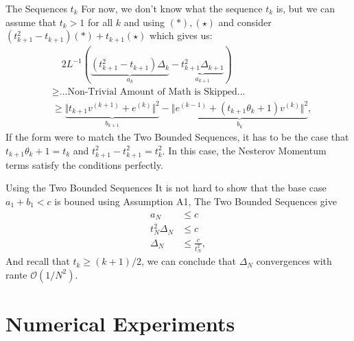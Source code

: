 \documentclass[11pt]{beamer}
\begin{document}
        \begin{frame}{The Sequences $t_k$}
            For now, we don't know what the sequence $t_k$ is, but we can assume that $t_k > 1$ for all $k$ and using $(*), (\star)$ and consider $(t_{k + 1}^2- t_{k + 1})(*) + t_{k + 1}(\star)$ which gives us: 
            {\scriptsize
                \begin{align*}
                    & \quad 2L^{-1}(
                        \underbrace{(t_{k + 1}^2 - t_{k + 1})
                        \Delta_k}_{a_k}
                        - 
                        \underbrace{t_{k + 1}^2\Delta_{k + 1}}_{a_{k + 1}}
                    )
                    \\
                    & \ge \text{...Non-Trivial Amount of Math is Skipped...}
                    \\
                    & \ge  
                    \underbrace{\Vert t_{k + 1}v^{(k + 1)} + e^{(k)}\Vert^2}_{b_{k + 1}}
                    - 
                    \underbrace{\Vert e^{(k - 1)} + (t_{k + 1}\theta_k + 1) v^{(k)} \Vert^2}_{b_k},
                    \tag{$\star \star$}
                \end{align*}
                }
                If the form were to match the Two Bounded Sequences, it has to be the case that $t_{k + 1}\theta_k + 1 = t_{k}$ and $t^2_{k + 1} - t_{k + 1}^2 = t_k^2$. In this case, the Nesterov Momentum terms satisfy the conditions perfectly. 
        \end{frame}
        \begin{frame}{Using the Two Bounded Sequences}
            It is not hard to show that the base case $a_1 + b_1 < c$ is bouned using Assumption A1, The Two Bounded Sequences give
            \begin{align}
                a_N &\le c
                \\
                t_N^2\Delta_N &\le c
                \\
                \Delta_N &\le \frac{c}{t_N^2}, 
            \end{align}
            And recall that $t_k \ge (k + 1)/2$, we can conclude that $\Delta_N$ convergences with rante $\mathcal O (1/N^2)$. 
        \end{frame}
    
\section{Numerical Experiments}
\end{document}
